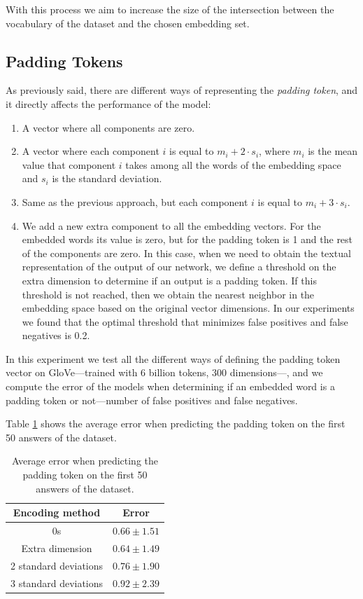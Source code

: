 \documentclass[]{article}
\begin{document}
	With this process we aim to increase the size of the intersection between the vocabulary of the dataset and the chosen embedding set.
	
	\subsection{Padding Tokens}
	
	As previously said, there are different ways of representing the \emph{padding token}, and it directly affects the performance of the model:
	
	\begin{enumerate}
		\item A vector where all components are zero.
		\item A vector where each component $ i $ is equal to $ m_i + 2 \cdot s_i $, where $ m_i $ is the mean value that component $ i $ takes among all the words of the embedding space and $ s_i $ is the standard deviation.
		\item Same as the previous approach, but each component $ i $ is equal to $ m_i + 3 \cdot s_i $.
		\item We add a new extra component to all the embedding vectors. For the embedded words its value is zero, but for the padding token is 1 and the rest of the components are zero. In this case, when we need to obtain the textual representation of the output of our network, we define a threshold on the extra dimension to determine if an output is a padding token. If this threshold is not reached, then we obtain the nearest neighbor in the embedding space based on the original vector dimensions. In our experiments we found that the optimal threshold that minimizes false positives and false negatives is 0.2.
	\end{enumerate}
	
	In this experiment we test all the different ways of defining the padding token vector on GloVe---trained with 6 billion tokens, 300 dimensions---, and we compute the error of the models when determining if an embedded word is a padding token or not---number of false positives and false negatives.
	
	Table \ref{t:tokens} shows the average error when predicting the padding token on the first 50 answers of the dataset.
	
	\begin{table}[H]
		\centering
		\begin{tabular}{@{}cc@{}}
			\toprule
			Encoding method		  & Error \\ \midrule
			0s                    & $0.66 \pm 1.51$              \\
			Extra dimension       & $0.64 \pm 1.49$              \\
			2 standard deviations & $0.76 \pm 1.90$              \\
			3 standard deviations & $0.92 \pm 2.39$              \\ \bottomrule
		\end{tabular}
		\caption{Average error when predicting the padding token on the first 50 answers of the dataset.}
		\label{t:tokens}
	\end{table}
	
\end{document}
